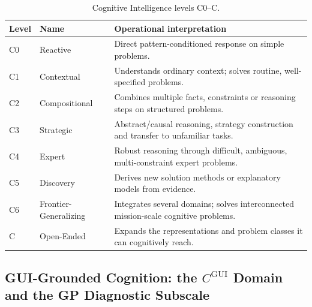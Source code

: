 \begin{table}[!htbp]
\centering\small
\begin{tabularx}{\textwidth}{@{}llY@{}}
\toprule
Level & Name & Operational interpretation \\
\midrule
C0 & Reactive & Direct pattern-conditioned response on simple problems. \\
C1 & Contextual & Understands ordinary context; solves routine, well-specified problems. \\
C2 & Compositional & Combines multiple facts, constraints or reasoning steps on structured problems. \\
C3 & Strategic & Abstract/causal reasoning, strategy construction and transfer to unfamiliar tasks. \\
C4 & Expert & Robust reasoning through difficult, ambiguous, multi-constraint expert problems. \\
C5 & Discovery & Derives new solution methods or explanatory models from evidence. \\
C6 & Frontier-Generalizing & Integrates several domains; solves interconnected mission-scale cognitive problems. \\
C\Om{} & Open-Ended & Expands the representations and problem classes it can cognitively reach. \\
\bottomrule
\end{tabularx}
\caption{Cognitive Intelligence levels C0--C\Om{}.}
\label{tab:clevels}
\end{table}

\subsection{GUI-Grounded Cognition: the \texorpdfstring{$C^{\mathrm{GUI}}$}{C-GUI} Domain and the GP Diagnostic Subscale}\label{sec:gp}

